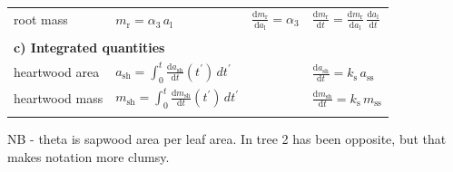 \documentclass[12pt, a4paper]{article}
\begin{document}
\begin{table}[h]
{\begin{doublespace}
\begin{tabular}{p{2.5cm}p{3.5cm}p{5cm}p{4cm} }
  root mass &
    $m_\textrm{r} = \alpha_3 \, a_\textrm{l}$ &
    $\frac{\textrm{d}m_\textrm{r}}{\textrm{d}a_\textrm{l}} = \alpha_3$  &
    $\frac{\textrm{d}m_\textrm{r}}{\textrm{d}t}  = \frac{\textrm{d}m_\textrm{r}}{\textrm{d}a_\textrm{l}}  \, \frac{\textrm{d}a_\textrm{l}}{\textrm{d}t}$ \\ \\

  \multicolumn{4}{l}{\textbf{c) Integrated quantities}} \\
  heartwood area &
    $a_\textrm{sh} = \int_0^t \frac{\textrm{d}a_\textrm{sh}}{\textrm{d}t}(t^\prime) \, dt^\prime$ &
     &
    $\frac{\textrm{d}a_\textrm{sh}}{\textrm{d}t} = k_\textrm{s} \, a_\textrm{ss}$ \\
  heartwood mass &
    $m_\textrm{sh} = \int_0^t \frac{\textrm{d}m_\textrm{sh}}{\textrm{d}t}(t^\prime) \, dt^\prime$ &
     &
    $\frac{\textrm{d}m_\textrm{sh}}{\textrm{d}t} = k_\textrm{s} \, m_\textrm{ss}$ \\
  \hline \\
\end{tabular}
NB -  theta is sapwood area per leaf area. In tree 2 has been opposite, but that makes notation more clumsy.
\end{doublespace}}
\label{tab:allometry}
\end{table}

\newpage
\end{document}
